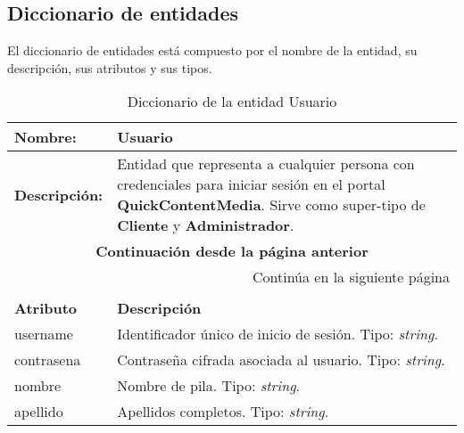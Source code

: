 \subsection{Diccionario de entidades}

El diccionario de entidades está compuesto por el nombre de la entidad, su descripción, sus atributos y sus tipos. 

\renewcommand{\arraystretch}{1.3}
\begin{longtable}{|p{3.5cm}|p{10cm}|}
\caption{Diccionario de la entidad Usuario}
\label{tab:diccionarioUsuario} \\ \hline
\textbf{Nombre:} & Usuario \\ \hline
\textbf{Descripción:} & 
Entidad que representa a cualquier persona con credenciales para iniciar sesión en el portal \textbf{QuickContentMedia}.  
Sirve como super-tipo de \textbf{Cliente} y \textbf{Administrador}. \\ \hline
\endfirsthead

\multicolumn{2}{c}{\textbf{Continuación desde la página anterior}} \\ \hline
\endhead

\hline \multicolumn{2}{r}{{Continúa en la siguiente página}} \\ \hline
\endfoot

\hline
\endlastfoot

\multicolumn{2}{|p{13.5cm}|}{\textbf{ATRIBUTOS}} \\ \hline
\textbf{Atributo} & \textbf{Descripción} \\ \hline
username   & Identificador único de inicio de sesión.  
Tipo: \textit{string}. \\ \hline
contrasena & Contraseña cifrada asociada al usuario.  
Tipo: \textit{string}. \\ \hline
nombre     & Nombre de pila.  
Tipo: \textit{string}. \\ \hline
apellido   & Apellidos completos.  
Tipo: \textit{string}. \\ \hline
\end{longtable}

